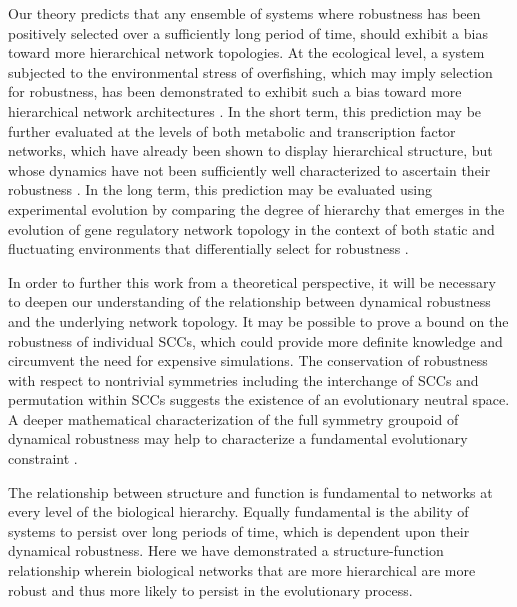Our theory predicts that any ensemble of systems where robustness has been positively selected over a sufficiently long period of time, should exhibit a bias toward more hierarchical network topologies. At the ecological level, a system subjected to the environmental stress of overfishing, which may imply selection for robustness, has been demonstrated to exhibit such a bias toward more hierarchical network architectures \cite{Bascompte2005}. In the short term, this prediction may be further evaluated at the levels of both metabolic and transcription factor networks, which have already been shown to display hierarchical structure, but whose dynamics have not been sufficiently well characterized to ascertain their robustness \cite{Zhao2006,Bhardwaj2010,Colm}.
In the long term, this prediction may be evaluated using experimental evolution by comparing the degree of hierarchy that emerges in the evolution of gene regulatory network topology in the context of both static and fluctuating environments that differentially select for robustness \cite{Leroi1994}.

In order to further this work from a theoretical perspective, it will be necessary to deepen our understanding of the relationship between dynamical robustness and the underlying network topology.
It may be possible to prove a bound on the robustness of individual SCCs, which could provide more definite knowledge and circumvent the need for expensive simulations. The conservation of robustness with respect to nontrivial symmetries including the interchange of SCCs and permutation within SCCs suggests the existence of an evolutionary neutral space. A deeper mathematical characterization of the full symmetry groupoid of dynamical robustness may help to characterize a fundamental evolutionary constraint \cite{Golubitsky2006}.

The relationship between structure and function is fundamental to networks at every level of the biological hierarchy. Equally fundamental is the ability of systems to persist over long periods of time, which is dependent upon their dynamical robustness. Here we have demonstrated a structure-function relationship wherein biological networks that are more hierarchical are more robust and thus more likely to persist in the evolutionary process.
